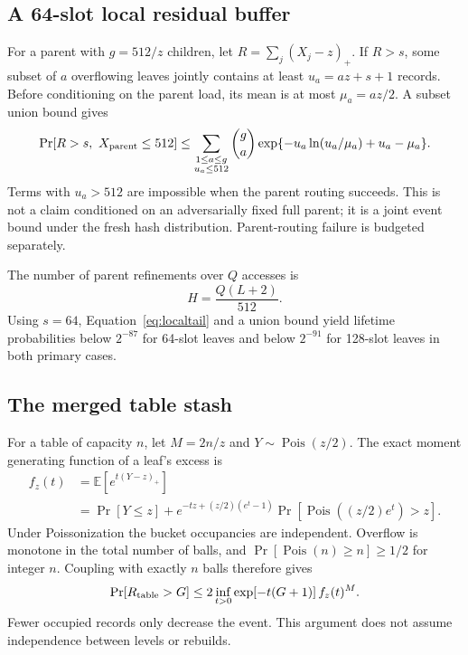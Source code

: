 \documentclass[11pt]{article}
\begin{document}
\subsection{A 64-slot local residual buffer}
For a parent with $g=512/z$ children, let $R=\sum_j(X_j-z)_+$. If $R>s$,
some subset of $a$ overflowing leaves jointly contains at least
$u_a=az+s+1$ records. Before conditioning on the parent load, its mean
is at most $\mu_a=az/2$. A subset union bound gives
\begin{equation}\label{eq:localtail}
 \Pr[R>s,\ X_{\rm parent}\le512]
 \le \sum_{\substack{1\le a\le g\\u_a\le512}}
 \binom ga\exp\{-u_a\ln(u_a/\mu_a)+u_a-\mu_a\}.
\end{equation}
Terms with $u_a>512$ are impossible when the parent routing succeeds.
This is not a claim conditioned on an adversarially fixed full parent;
it is a joint event bound under the fresh hash distribution. Parent-routing
failure is budgeted separately.

The number of parent refinements over $Q$ accesses is
\begin{equation}
 H=\frac{Q(L+2)}{512}.
\end{equation}
Using $s=64$, Equation~\eqref{eq:localtail} and a union bound yield lifetime
probabilities below $2^{-87}$ for 64-slot leaves and below $2^{-91}$ for
128-slot leaves in both primary cases.

\subsection{The merged table stash}
For a table of capacity $n$, let $M=2n/z$ and $Y\sim\operatorname{Pois}(z/2)$.
The exact moment generating function of a leaf's excess is
\begin{align}
 f_z(t)&=\mathbb E[e^{t(Y-z)_+}]\nonumber\\
 &=\Pr[Y\le z]+e^{-tz+(z/2)(e^t-1)}
        \Pr[\operatorname{Pois}((z/2)e^t)>z].\label{eq:mgf}
\end{align}
Under Poissonization the bucket occupancies are independent. Overflow is
monotone in the total number of balls, and
$\Pr[\operatorname{Pois}(n)\ge n]\ge1/2$ for integer $n$. Coupling with
exactly $n$ balls therefore gives
\begin{equation}\label{eq:globaltail}
 \Pr[R_{\rm table}>G]
 \le2\inf_{t>0}\exp[-t(G+1)]\,f_z(t)^M.
\end{equation}
Fewer occupied records only decrease the event. This argument does not
assume independence between levels or rebuilds.
\end{document}
